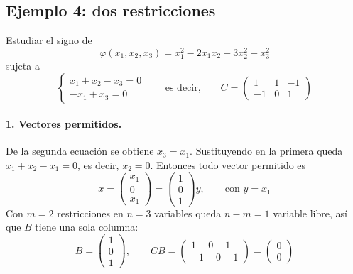 \documentclass{article}
\begin{document}
\subsection*{Ejemplo 4: dos restricciones}

Estudiar el signo de
\[
\varphi(x_1,x_2,x_3)
= x_1^2 - 2x_1x_2 + 3x_2^2 + x_3^2
\]
sujeta a
\[
\begin{cases}
x_1 + x_2 - x_3 = 0\\
-x_1 + x_3 = 0
\end{cases}
\qquad\text{es decir,}\qquad
C=
\begin{pmatrix}
1 & 1 & -1\\
-1 & 0 & 1
\end{pmatrix}
\]

\paragraph*{1. Vectores permitidos.}
De la segunda ecuación se obtiene \(x_3=x_1\). Sustituyendo en la primera queda \(x_1+x_2-x_1=0\), es decir, \(x_2=0\). Entonces todo vector permitido es
\[
x=
\begin{pmatrix}
x_1\\
0\\
x_1
\end{pmatrix}
=
\begin{pmatrix}
1\\
0\\
1
\end{pmatrix}y,
\qquad\text{con } y=x_1
\]
Con \(m=2\) restricciones en \(n=3\) variables queda \(n-m=1\) variable libre, así que \(B\) tiene una sola columna:
\[
B=
\begin{pmatrix}
1\\
0\\
1
\end{pmatrix},
\qquad
CB=
\begin{pmatrix}
1+0-1\\
-1+0+1
\end{pmatrix}
=
\begin{pmatrix}
0\\
0
\end{pmatrix}
\]
\end{document}
